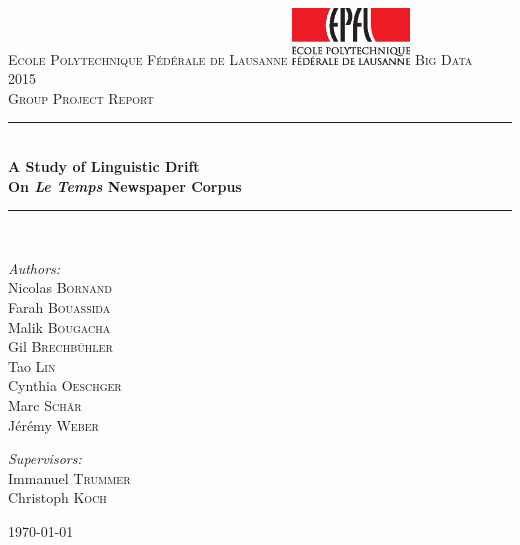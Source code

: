 \documentclass[a4paper,11pt] {article}
\newcommand{\HRule}{\rule{\linewidth}{0.5mm}}
\begin{document}
\begin{titlepage}
\begin{center}
\textsc{\LARGE Ecole Polytechnique Fédérale de Lausanne}
\vskip 0.5cm
\includegraphics[height=1.5cm]{Pictures/EPFL-Logo-CMJN.eps}
\vskip 0.5cm
\textsc{\Large Big Data\\
 2015}\\[1.5cm]

\textsc{\Large Group Project Report}\\[3cm]

\HRule \\[0.4cm]
{ \huge \bfseries A Study of Linguistic Drift\\[0.5cm] }
{ \huge \bfseries On \emph{Le Temps} Newspaper Corpus\\[0.4cm] }

\HRule \\[3.5cm]

\begin{minipage}{0.5\textwidth}
\begin{flushleft} \large
\textit{Authors:}\\
Nicolas \textsc{Bornand}\\
Farah \textsc{Bouassida}\\
Malik \textsc{Bougacha}\\
Gil \textsc{Brechbühler}\\
Tao \textsc{Lin}\\
Cynthia \textsc{Oeschger}\\
Marc \textsc{Schär}\\
Jérémy \textsc{Weber}\\
\end{flushleft}
\end{minipage}
\begin{minipage}{0.4\textwidth}
\begin{flushright} \large
\textit{Supervisors:} \\
Immanuel \textsc{Trummer}\\
Christoph \textsc{Koch}\\
\end{flushright}
\end{minipage}

\vfill

{\large \today}

\end{center}
\end{titlepage}
\end{document}
